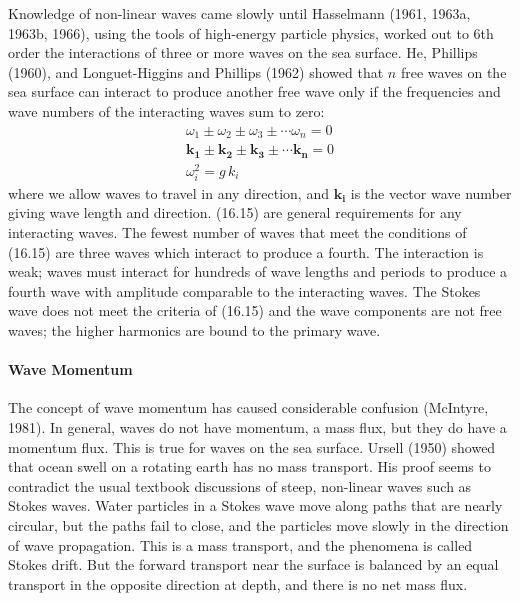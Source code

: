 Knowledge of non-linear waves came slowly until Hasselmann (1961,
1963a, 1963b, 1966), using the tools of high-energy particle physics,
worked out to 6th order the interactions of three or more waves on the
sea surface. He, Phillips (1960), and Longuet-Higgins and Phillips
(1962) showed that $n$ free waves on the sea surface can interact to
produce another free wave only if the frequencies and wave numbers of
the interacting waves sum to zero:
\begin{subequations}
\begin{eqnarray}
 & \omega _{1} \pm \omega _{2} \pm \omega _{3} \pm \cdots \omega _{n}  = 0
& \\
 & \mathbf{k_{1}} \pm  \mathbf{k_{2}} \pm  \mathbf{k_{3}} \pm \cdots
\mathbf{k_{n}} =  0  &
\\
 & \omega_{i}^{2} = g \, k_{i} &
\end{eqnarray}
\end{subequations}
where we allow waves to travel in any direction, and $\mathbf{k_{i}}$
is the vector wave number giving wave length and direction. (16.15)
are general requirements for any interacting waves. The fewest number
of waves that meet the conditions of (16.15) are three waves which
interact to produce a fourth. The interaction is weak; waves must
interact for hundreds of wave lengths and periods to produce a fourth
wave with amplitude comparable to the interacting waves. The Stokes
wave does not meet the criteria of (16.15) and the wave components are
not free waves; the higher harmonics are bound to the primary wave.

\paragraph{Wave Momentum}
The concept of wave momentum has caused
considerable confusion (McIntyre, 1981). In general, waves do not have
momentum, a mass flux, but they do have a momentum flux. This is true
for waves on the sea surface. Ursell (1950) showed that ocean swell on
a rotating earth has no mass transport.  His
proof seems to contradict the usual textbook discussions of steep,
non-linear waves such as Stokes waves. Water particles in a Stokes
wave move along paths that are nearly circular, but the paths fail to
close, and the particles move slowly in the direction of wave
propagation. This is a mass transport, and the phenomena is called
Stokes drift. But the forward transport near the surface is balanced
by an equal transport in the opposite direction at depth, and there is
no net mass flux.

